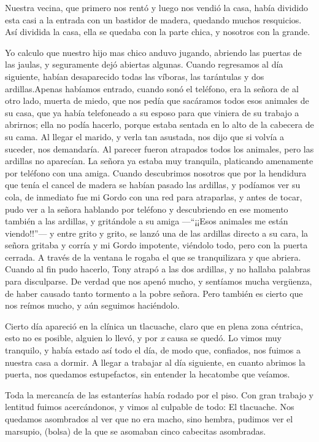 \documentclass[letterpaper, 12pt]{book}
\begin{document}
Nuestra vecina, que primero nos rentó y luego nos vendió la casa, había dividido esta casi a la entrada con un bastidor de madera, quedando muchos resquicios. Así dividida la  casa, ella se quedaba con la parte chica, y nosotros con la grande.

Yo calculo que nuestro hijo mas chico anduvo jugando, abriendo las puertas de las jaulas, y seguramente dejó abiertas algunas. Cuando regresamos al día siguiente, habían desaparecido todas las víboras, las tarántulas y dos ardillas.Apenas habíamos entrado, cuando sonó el teléfono, era la señora de al otro lado, muerta de miedo, que nos pedía que sacáramos todos esos animales de su casa, que ya había telefoneado a su esposo para que viniera de su trabajo a abrirnos; ella no podía hacerlo, porque estaba sentada en lo alto de la cabecera de su cama. Al llegar el marido, y verla tan asustada, nos dijo que si volvía a suceder, nos demandaría. Al parecer fueron atrapados todos los animales, pero las ardillas no aparecían. La señora ya estaba muy tranquila, platicando amenamente  por teléfono con una amiga. Cuando descubrimos nosotros que por la hendidura que tenía el cancel de madera se habían pasado las ardillas, y podíamos ver su cola, de inmediato fue mi Gordo con una red para atraparlas, y antes de tocar, pudo ver a la señora hablando por teléfono y descubriendo en ese momento también a las ardillas, y gritándole a su amiga ---``¡¡Esos animales me están viendo!!''--- y entre grito y grito, se lanzó una de las ardillas directo a su cara, la señora gritaba y corría y mi Gordo impotente, viéndolo todo, pero con la puerta cerrada. A través de la ventana le rogaba el que se tranquilizara y que abriera. Cuando al fin pudo hacerlo, Tony atrapó a las dos ardillas, y no hallaba palabras para disculparse. De verdad que nos apenó mucho, y sentíamos mucha vergüenza, de haber causado tanto tormento a la pobre señora. Pero también  es cierto que nos reímos mucho, y aún seguimos haciéndolo.

Cierto día apareció en la clínica un tlacuache, claro que en plena zona céntrica, esto no es posible, alguien lo llevó, y por \textit{x } causa se quedó. Lo vimos muy tranquilo, y había estado así todo el día, de modo que, confiados, nos fuimos a nuestra casa a dormir. A llegar a trabajar al día siguiente, en cuanto abrimos la puerta, nos quedamos estupefactos, sin entender la hecatombe que veíamos.

Toda la mercancía de las estanterías había rodado por el piso. Con gran trabajo y lentitud fuimos acercándonos, y vimos al culpable de todo: El tlacuache. Nos quedamos asombrados al ver que no era macho, sino hembra, pudimos ver el marsupio, (bolsa) de la que se asomaban cinco cabecitas asombradas.
\end{document}
